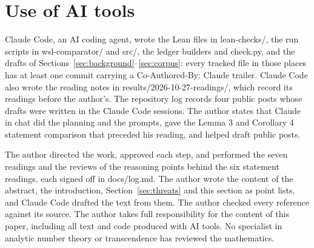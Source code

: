 \section{Use of AI tools}\label{sec:ai}

Claude Code, an AI coding agent, wrote the Lean files in lean-checks/, the run scripts in wsl-comparator/ and src/, the ledger builders and check.py, and the drafts of Sections~\ref{sec:background}--\ref{sec:corpus}: every tracked file in those places has at least one commit carrying a Co-Authored-By: Claude trailer. %
Claude Code also wrote the reading notes in results/2026-10-27-readings/, which record its readings before the author's. %
The repository log records four public posts whose drafts were written in the Claude Code sessions. %
The author states that Claude in chat did the planning and the prompts, gave the Lemma 3 and Corollary 4 statement comparison that preceded his reading, and helped draft public posts. %

The author directed the work, approved each step, and performed the seven readings and the reviews of the reasoning points behind the six statement readings, each signed off in docs/log.md. %
The author wrote the content of the abstract, the introduction, Section~\ref{sec:threats} and this section as point lists, and Claude Code drafted the text from them. %
The author checked every reference against its source. %
The author takes full responsibility for the content of this paper, including all text and code produced with AI tools. %
No specialist in analytic number theory or transcendence has reviewed the mathematics. %
